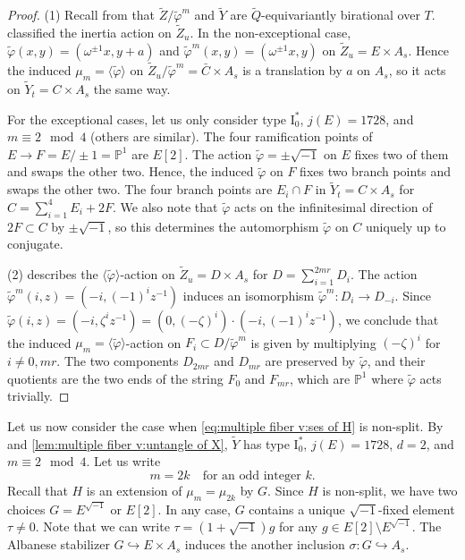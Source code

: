\documentclass[reqno, letterpaper]{amsart}
\numberwithin{equation}{subsection}
\let\to\longrightarrow
\newcommand{\PP}{\mathbb{P}}
\begin{document}
		\begin{proof}
			(1) Recall from  that $\tilde Z / \tilde \varphi^m$ and $\tilde Y$ are $\tilde Q$-equivariantly birational over $T$.  classified the inertia action on $\tilde Z_u$. In the non-exceptional case, $\tilde \varphi (x,y) = (\omega^{\pm1} x, y+a)$ and $\tilde \varphi^m(x,y) = (\omega^{\pm 1}x ,y)$ on $\tilde Z_u = E \times A_s$. Hence the induced $\mu_m = \langle \tilde \varphi \rangle$ on $\tilde Z_u / \tilde \varphi^m = \bar C \times A_s$ is a translation by $a$ on $A_s$, so it acts on $\tilde Y_t = C \times A_s$ the same way.
			
			\medskip
			
			For the exceptional cases, let us only consider type $\mathrm I_0^*$, $j(E) = 1728$, and $m \equiv 2 \mod 4$ (others are similar). The four ramification points of $E \to F = E/\pm1 = \PP^1$ are $E[2]$. The action $\tilde \varphi = \pm \sqrt{-1}$ on $E$ fixes two of them and swaps the other two. Hence, the induced $\tilde \varphi$ on $F$ fixes two branch points and swaps the other two. The four branch points are $E_i \cap F$ in $\tilde Y_t = C \times A_s$ for $C = \sum_{i=1}^4 E_i + 2F$. We also note that $\tilde \varphi$ acts on the infinitesimal direction of $2F \subset C$ by $\pm \sqrt{-1}$, so this determines the automorphism $\tilde \varphi$ on $C$ uniquely up to conjugate.
			
			\medskip
			
			(2)  describes the $\langle \tilde \varphi \rangle$-action on $\tilde Z_u = D \times A_s$ for $D = \sum_{i=1}^{2mr} D_i$. The action $\tilde \varphi^m(i,z) = (-i, (-1)^i z^{-1})$ induces an isomorphism $\tilde \varphi^m : D_i \to D_{-i}$. Since $\tilde \varphi(i,z) = (-i, \zeta^i z^{-1}) = (0, (-\zeta)^i) \cdot (-i, (-1)^i z^{-1})$, we conclude that the induced $\mu_m = \langle \tilde \varphi \rangle$-action on $F_i \subset D / \tilde \varphi^m$ is given by multiplying $(-\zeta)^i$ for $i \neq 0, mr$. The two components $D_{2mr}$ and $D_{mr}$ are preserved by $\tilde \varphi$, and their quotients are the two ends of the string $F_0$ and $F_{mr}$, which are $\PP^1$ where $\tilde \varphi$ acts trivially.
		\end{proof}
		
		Let us now consider the case when \eqref{eq:multiple fiber v:ses of H} is non-split. By  and \ref{lem:multiple fiber v:untangle of X}, $\tilde Y$ has type $\mathrm I_0^*$, $j(E) = 1728$, $d = 2$, and $m \equiv 2 \mod 4$. Let us write
		\[ m = 2k \quad\mbox{for an odd integer } k .\]
		Recall that $H$ is an extension of $\mu_m = \mu_{2k}$ by $G$. Since $H$ is non-split, we have two choices $G = E^{\sqrt{-1}}$ or $E[2]$. In any case, $G$ contains a unique $\sqrt{-1}$-fixed element $\tau \neq 0$. Note that we can write $\tau = (1+\sqrt{-1})g$ for any $g \in E[2] \setminus E^{\sqrt{-1}}$. The Albanese stabilizer $G \hookrightarrow E \times A_s$ induces the another inclusion $\sigma : G \hookrightarrow A_s$.
		
\end{document}
